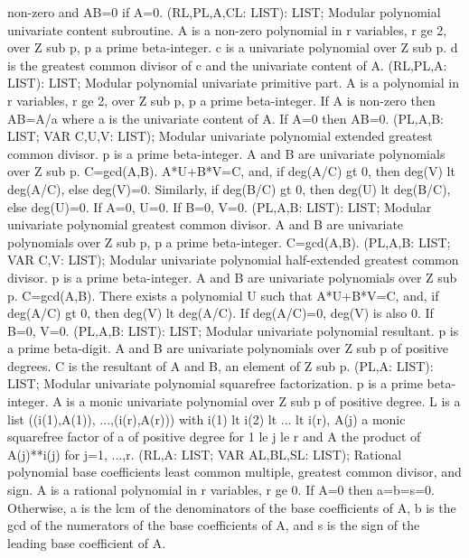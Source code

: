non-zero and AB=0 if A=0. \ecom 
{} (RL,PL,A,CL: LIST): LIST; \eproc
\bcom Modular polynomial univariate content subroutine. A is a non-zero
polynomial in r variables, r ge 2, over Z sub p, p a prime
beta-integer.  c is a univariate polynomial over Z sub p.  d is the
greatest common divisor of c and the univariate content of A. \ecom 
{} (RL,PL,A: LIST): LIST; \eproc
\bcom Modular polynomial univariate primitive part. A is a polynomial in
r variables, r ge 2, over Z sub p, p a prime beta-integer.  If A is
non-zero then AB=A/a where a is the univariate content of A.  If A=0
then AB=0. \ecom 
{} (PL,A,B: LIST; VAR C,U,V: LIST); \eproc
\bcom Modular univariate polynomial extended greatest common divisor. p
is a prime beta-integer.  A and B are univariate polynomials over Z sub
p. C=gcd(A,B).  A*U+B*V=C, and, if deg(A/C) gt 0, then deg(V) lt
deg(A/C), else deg(V)=0.  Similarly, if deg(B/C) gt 0, then deg(U) lt
deg(B/C), else deg(U)=0. If A=0, U=0. If B=0, V=0. \ecom 
{} (PL,A,B: LIST): LIST; \eproc
\bcom Modular univariate polynomial greatest common divisor. A and B are
univariate polynomials over Z sub p, p a prime beta-integer.
C=gcd(A,B). \ecom 
{} (PL,A,B: LIST; VAR C,V: LIST); \eproc
\bcom Modular univariate polynomial half-extended greatest common divisor.
p is a prime beta-integer.  A and B are univariate polynomials over
Z sub p.  C=gcd(A,B).  There exists a polynomial U such that
A*U+B*V=C, and, if deg(A/C) gt 0, then deg(V) lt deg(A/C).  If
deg(A/C)=0, deg(V) is also 0. If B=0, V=0. \ecom 
{} (PL,A,B: LIST): LIST; \eproc
\bcom Modular univariate polynomial resultant. p is a prime beta-digit.
A and B are univariate polynomials over Z sub p of positive degrees.
C is the resultant of A and B, an element of Z sub p. \ecom 
{} (PL,A: LIST): LIST; \eproc
\bcom Modular univariate polynomial squarefree factorization. p is a
prime beta-integer.  A is a monic univariate polynomial over Z sub p
of positive degree.  L is a list ((i(1),A(1)), ...,(i(r),A(r))) with
i(1) lt i(2) lt  ... lt i(r), A(j) a monic squarefree factor of a
of positive degree for 1 le j le r and A the product of A(j)**i(j)
for j=1, ...,r. \ecom 
{} (RL,A: LIST; VAR AL,BL,SL: LIST); \eproc
\bcom Rational polynomial base coefficients least common multiple, greatest common divisor, and sign.
A is a rational polynomial in r variables, r ge 0.  If A=0 then 
a=b=s=0.  Otherwise, a is the lcm of the denominators of the 
base coefficients of A, b is the gcd of the numerators of 
the base coefficients of A, and s is the sign of the leading base 
coefficient of A. \ecom 

